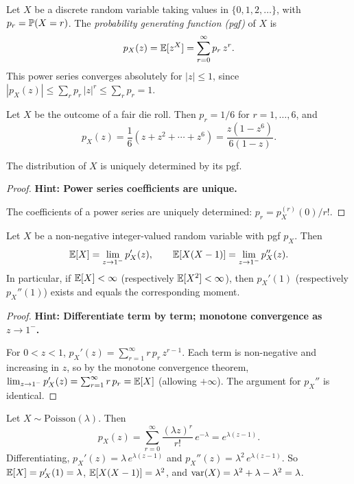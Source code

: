 \documentclass[a4paper]{article}
\begin{document}
\begin{defi}
  Let $X$ be a discrete random variable taking values in $\{0, 1, 2, \dotsc\}$, with $p_r = \P(X = r)$. The \emph{probability generating function (pgf)} of $X$ is
  \[
    p_X(z) = \E[z^X] = \sum_{r = 0}^\infty p_r\, z^r.
  \]
  This power series converges absolutely for $|z| \leq 1$, since $|p_X(z)| \leq \sum_r p_r\, |z|^r \leq \sum_r p_r = 1$.
\end{defi}

\begin{eg}
  Let $X$ be the outcome of a fair die roll. Then $p_r = 1/6$ for $r = 1, \dotsc, 6$, and
  \[
    p_X(z) = \frac{1}{6}(z + z^2 + \cdots + z^6) = \frac{z(1 - z^6)}{6(1 - z)}.
  \]
\end{eg}

\begin{thm}
  The distribution of $X$ is uniquely determined by its pgf.
\end{thm}

\begin{proof}
  \textbf{Hint: Power series coefficients are unique.}

  The coefficients of a power series are uniquely determined: $p_r = p_X^{(r)}(0)/r!$.
\end{proof}

\begin{thm}
  Let $X$ be a non-negative integer-valued random variable with pgf $p_X$. Then
  \[
    \E[X] = \lim_{z\to 1^-}p_X'(z), \qquad \E[X(X - 1)] = \lim_{z \to 1^-}p_X''(z).
  \]
  In particular, if $\E[X] < \infty$ (respectively $\E[X^2] < \infty$), then $p_X'(1)$ (respectively $p_X''(1)$) exists and equals the corresponding moment.
\end{thm}

\begin{proof}
  \textbf{Hint: Differentiate term by term; monotone convergence as $z \to 1^-$.}

  For $0 < z < 1$, $p_X'(z) = \sum_{r=1}^\infty r\,p_r\, z^{r - 1}$. Each term is non-negative and increasing in $z$, so by the monotone convergence theorem, $\lim_{z \to 1^-} p_X'(z) = \sum_{r=1}^\infty r\,p_r = \E[X]$ (allowing $+\infty$). The argument for $p_X''$ is identical.
\end{proof}

\begin{eg}
  Let $X\sim \mathrm{Poisson}(\lambda)$. Then
  \[
    p_X(z) = \sum_{r=0}^\infty \frac{(\lambda z)^r}{r!}\, e^{-\lambda} = e^{\lambda(z - 1)}.
  \]
  Differentiating, $p_X'(z) = \lambda\, e^{\lambda(z-1)}$ and $p_X''(z) = \lambda^2\, e^{\lambda(z-1)}$. So $\E[X] = p_X'(1) = \lambda$, $\E[X(X-1)] = \lambda^2$, and $\var(X) = \lambda^2 + \lambda - \lambda^2 = \lambda$.
\end{eg}
\end{document}

